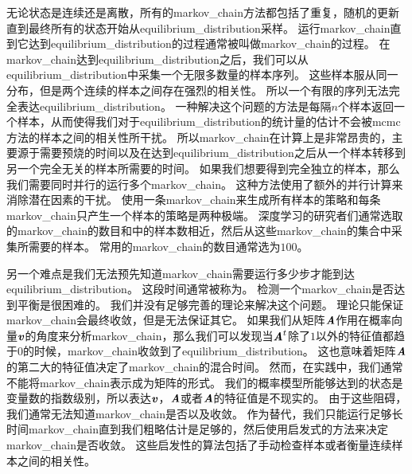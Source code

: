 无论状态是连续还是离散，所有的\gls{markov_chain}方法都包括了重复，随机的更新直到最终所有的状态开始从\gls{equilibrium_distribution}采样。
运行\gls{markov_chain}直到它达到\gls{equilibrium_distribution}的过程通常被叫做\gls{markov_chain}的过程。
在\gls{markov_chain}达到\gls{equilibrium_distribution}之后，我们可以从\gls{equilibrium_distribution}中采集一个无限多数量的样本序列。
这些样本服从同一分布，但是两个连续的样本之间存在强烈的相关性。
所以一个有限的序列无法完全表达\gls{equilibrium_distribution}。
一种解决这个问题的方法是每隔$n$个样本返回一个样本，从而使得我们对于\gls{equilibrium_distribution}的统计量的估计不会被\gls{mcmc}方法的样本之间的相关性所干扰。
所以\gls{markov_chain}在计算上是非常昂贵的，主要源于需要预烧的时间以及在达到\gls{equilibrium_distribution}之后从一个样本转移到另一个完全无关的样本所需要的时间。
如果我们想要得到完全独立的样本，那么我们需要同时并行的运行多个\gls{markov_chain}。
这种方法使用了额外的并行计算来消除潜在因素的干扰。
使用一条\gls{markov_chain}来生成所有样本的策略和每条\gls{markov_chain}只产生一个样本的策略是两种极端。
深度学习的研究者们通常选取的\gls{markov_chain}的数目和中的样本数相近，然后从这些\gls{markov_chain}的集合中采集所需要的样本。
常用的\gls{markov_chain}的数目通常选为$100$。

另一个难点是我们无法预先知道\gls{markov_chain}需要运行多少步才能到达\gls{equilibrium_distribution}。 
这段时间通常被称为。
检测一个\gls{markov_chain}是否达到平衡是很困难的。
我们并没有足够完善的理论来解决这个问题。
理论只能保证\gls{markov_chain}会最终收敛，但是无法保证其它。
如果我们从矩阵$\boldsymbol{\mathit{A}}$作用在概率向量$\boldsymbol{\mathit{v}}$的角度来分析\gls{markov_chain}，那么我们可以发现当$\boldsymbol{\mathit{A}}^t$除了$1$以外的特征值都趋于$0$的时候，\gls{markov_chain}收敛到了\gls{equilibrium_distribution}。
这也意味着矩阵$\boldsymbol{\mathit{A}}$的第二大的特征值决定了\gls{markov_chain}的混合时间。
然而，在实践中，我们通常不能将\gls{markov_chain}表示成为矩阵的形式。
我们的概率模型所能够达到的状态是变量数的指数级别，所以表达$\boldsymbol{\mathit{v}}$，$\boldsymbol{\mathit{A}}$或者$\boldsymbol{\mathit{A}}$的特征值是不现实的。
由于这些阻碍，我们通常无法知道\gls{markov_chain}是否以及收敛。
作为替代，我们只能运行足够长时间\gls{markov_chain}直到我们粗略估计是足够的，然后使用启发式的方法来决定\gls{markov_chain}是否收敛。
这些启发性的算法包括了手动检查样本或者衡量连续样本之间的相关性。



\section{}
\label{sec:gibbs_sampling}

